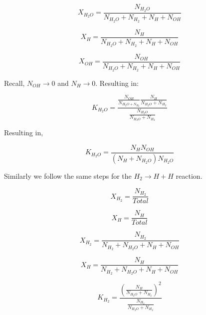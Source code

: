 \documentclass[12pt, Times New Roman]{article}
\begin{document}
    \begin{equation}
        X_{H_{2}O} = \frac{N_{H_{2}O}}{N_{H_{2}O} + N_{H_{2}} + N_{H} + N_{OH}}
    \end{equation}

    \begin{equation}
        X_{H} = \frac{N_{H}}{N_{H_{2}O} + N_{H_{2}} + N_{H} + N_{OH}}
    \end{equation}

    \begin{equation}
        X_{OH} = \frac{N_{OH}}{N_{H_{2}O} + N_{H_{2}} + N_{H} + N_{OH}}
    \end{equation}

    Recall, $N_{OH} \rightarrow 0$ and $N_{H} \rightarrow 0$. Resulting in:

    \begin{equation}
        K_{H_{2}O} = \frac{\frac{N_{OH}}{N_{H_{2}O + N_{H_{2}}}} \frac{N_{H}}{N_{H_{2}O} + N_{H_{2}}}}{\frac{N_{H_{2}O}}{N_{H_{2}O} + N_{H_{2}}}}
    \end{equation}

    Resulting in,

    \begin{equation}
        K_{H_{2}O} = \frac{N_{H} N_{OH}}{(N_{H} + N_{H_{2}O}) N_{H_{2}O}}
    \end{equation}

    Similarly we follow the same steps for the $H_{2} \rightarrow H + H$ reaction.

    \begin{equation}
        X_{H_{2}} = \frac{N_{H_{2}}}{Total}
    \end{equation}

    \begin{equation}
        X_{H} = \frac{N_{H}}{Total}
    \end{equation}

    \begin{equation}
        X_{H_{2}} = \frac{N_{H_{2}}}{N_{H_{2}} + N_{H_{2}O} + N_{H} + N_{OH}}
    \end{equation}

    \begin{equation}
        X_{H} = \frac{N_{H}}{N_{H_{2}} + N_{H_{2}O} + N_{H} + N_{OH}}
    \end{equation}

    \begin{equation}
        K_{H_{2}} = \frac{(\frac{N_{H}}{N_{H_{2}O} + N_{H_{2}}})^{2}}{\frac{N_{H_{2}}}{N_{H_{2}O} + N_{H_{2}}}}
    \end{equation}
\end{document}
